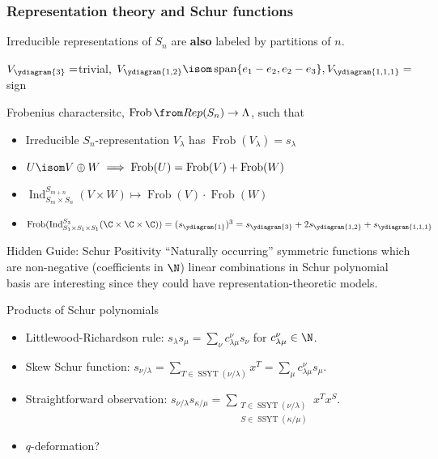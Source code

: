 \documentclass[dvipsnames]{beamer}
\renewcommand{\Span}{\operatorname{span}}
\DeclareMathOperator{\Ind}{Ind}
\DeclareMathOperator{\SSYT}{SSYT}
\theoremstyle{definition}
\newcounter{c}
\begin{document}
\begin{frame}
  \frametitle{Representation theory and Schur functions}
 Irreducible representations of \(S_n\) are \textbf{also} labeled by
      partitions of \(n\). \pause 
      \begin{center}
        \(V_{\ydiagram{3}} = \)trivial,
        \(V_{\ydiagram{1,2}} \isom \Span\{e_1-e_2, e_2-e_3\},
        V_{\ydiagram{1,1,1}} = \)sign
      \end{center}\pause
  Frobenius charactersitc, \(\operatorname{Frob}\from Rep(S_n) \to
  \Lambda\), such that \pause
    \begin{itemize}
    \item Irreducible \(S_n\)-representation \(V_\lambda\) has 
      \(\operatorname{Frob}(V_\lambda) = s_\lambda\) \pause
    \item \(U \isom V \oplus W \implies \operatorname{Frob}(U) = \operatorname{Frob}(V)+\operatorname{Frob}(W)\)\pause
    \item \(\Ind_{S_m \times S_n}^{S_{m+n}} (V \times W) \mapsto
      \operatorname{Frob}(V) \cdot \operatorname{Frob}(W)\) \pause
    \item \(\operatorname{Frob}( \Ind_{S_1 \times S_1 \times S_1}^{S_3} (\C \times \C
    \times \C) ) = (s_{\ydiagram{1}})^3 = s_{\ydiagram{3}} + 2 s_{\ydiagram{1,2}} + s_{\ydiagram{1,1,1}}\)\pause
    \end{itemize}
  \begin{block}{Hidden Guide: Schur Positivity}
    ``Naturally occurring'' symmetric functions which are non-negative
    (coefficients in \(\N\))
    linear combinations in Schur polynomial basis
     are interesting since they could have representation-theoretic models.
  \end{block}
\end{frame}
\begin{frame}{Products of Schur polynomials}
  \begin{itemize}
  \item Littlewood-Richardson rule: \(s_\lambda s_\mu = \sum_\nu c_{\lambda \mu}^\nu s_\nu\) for
    \(c_{\lambda\mu}^\nu \in \N\). \pause 
  \item Skew Schur function: \(s_{\nu/\lambda} = \sum_{T \in
      \SSYT(\nu/\lambda)} x^T = \sum_\mu c_{\lambda \mu}^\nu s_\mu\).\pause
  \item Straightforward observation: \(s_{\nu/\lambda} s_{\kappa/\mu} = \sum_{\substack{T \in \SSYT(\nu/\lambda) \\ S
        \in \SSYT(\kappa/\mu)}} x^T x^S\).\pause
  \item \(q\)-deformation?
  \end{itemize}
\end{frame}
\end{document}
